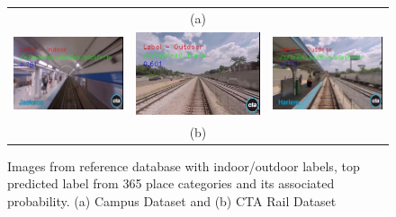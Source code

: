 \documentclass[twocolumn]{article}
\begin{document}
\begin{figure}[!htbp]
\begin{tabular*}{\textwidth}{lcr}
  & (a) & \\
  \includegraphics[scale=\scaleVal]{6-subwayStation} &
  \includegraphics[scale=\scaleVal]{7-railroadTrack} &
  \includegraphics[scale=\scaleVal]{8-trainStation} \\
  & (b) &
 \end{tabular*}
 \caption{Images from reference database with indoor/outdoor labels, top predicted label from 365 place categories and its associated probability. (a) Campus Dataset and (b) CTA Rail Dataset}
 \label{fig:labelledImages}
\end{figure}
\end{document}
